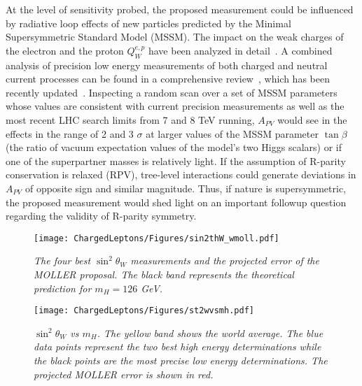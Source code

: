 At the level of sensitivity probed, the proposed measurement could be influenced by radiative loop effects of new 
particles predicted by the Minimal Supersymmetric Standard Model (MSSM). The impact on the weak charges of the
electron and the proton $Q_W^{e,p}$ have been analyzed in detail~\cite{ref:cl:Kurylov:2003zh}. A combined analysis of 
precision low energy measurements of both charged and neutral current processes can be found in a comprehensive review~\cite{ref:cl:RamseyMusolf:2006vr}, which has been recently updated~\cite{ref:cl:Erler:2013xha}. 
Inspecting a random scan over a set of MSSM parameters whose values are consistent with current precision 
measurements as well as the most recent LHC search limits from 7 and 8 TeV running, $A_{PV}$ would see 
in the effects in the range of 2 and 3 $\sigma$ at larger values of the MSSM parameter $\tan\beta$ (the ratio of vacuum expectation values of the model's two Higgs scalars) or if one of the superpartner 
masses is relatively light. 
If the assumption of R-parity conservation is relaxed (RPV), tree-level interactions could generate deviations 
in $A_{PV}$ of opposite sign and similar magnitude. Thus, if nature is supersymmetric, the proposed measurement
would shed light on an important followup question regarding the validity of R-parity symmetry.

{\vskip -12pt
\begin{figure}[ht]
\begin{minipage}[b]{0.48\linewidth}
\centering
\texttt{[image: ChargedLeptons/Figures/sin2thW\_wmoll.pdf]}
  \caption{{\it The four best $\sin^2\theta_W$ measurements and the projected error of the MOLLER proposal.
  The black band represents the theoretical prediction for $m_H = 126$ GeV.}}
\label{fig:cl:s2tw}
\end{minipage}
\hspace{0.3cm}
\begin{minipage}[b]{0.48\linewidth}
\centering
    \texttt{[image: ChargedLeptons/Figures/st2wvsmh.pdf]}
  \caption{{\it $\sin^2\theta_W$ vs $m_H$. The yellow band shows the world average. The blue data points
  represent the two best high energy determinations while the black points are the most precise low energy
  determinations. The projected MOLLER error is shown in red. }}
  \label{fig:cl:s2twvsmh}
\end{minipage}
\end{figure}
}

